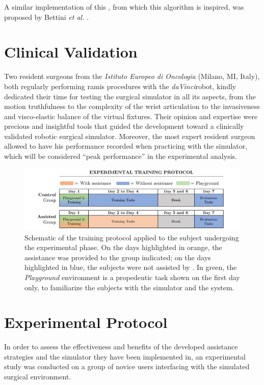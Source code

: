 \documentclass[../main.tex]{subfiles}
\begin{document}
A similar implementation of this \vf, from which this algorithm is inspired, was proposed by Bettini \textit{et al.} \cite{Bettini2004}.

\section{Clinical Validation}
\label{sec:clinicalvalidation}
Two resident surgeons from the \textit{Istituto Europeo di Oncologia} (Milano, MI, Italy), both regularly performing \ac{ramis} procedures with the \textit{daVinci}\cright robot, kindly dedicated their time for testing the surgical simulator in all its aspects, from the motion truthfulness to the complexity of the wrist articulation to the invasiveness and visco-elastic balance of the virtual fixtures. Their opinion and expertise were precious and insightful tools that guided the development toward a clinically validated robotic surgical simulator. 
Moreover, the most expert resident surgeon allowed to have his performance recorded when practicing with the simulator, which will be considered ``peak performance'' in the experimental analysis. 

\begin{figure}
    \centering
    \includegraphics[width=\textwidth]{images/training_protocol.png}
    \caption{Schematic of the training protocol applied to the subject undergoing the experimental phase. On the days highlighted in orange, the \vf assistance was provided to the group indicated; on the days highlighted in blue, the subjects were not assisted by \vfs. In green, the \textit{Playground} environment is a propedeutic task shown on the first day only, to familiarize the subjects with the simulator and the \davinci system.}
    \label{fig:trainingprotocol}
\end{figure}
\section{Experimental Protocol}
In order to assess the effectiveness and benefits of the developed assistance strategies and the simulator they have been implemented in, an experimental study was conducted on a group of novice users interfacing with the simulated surgical environment. 
\end{document}
